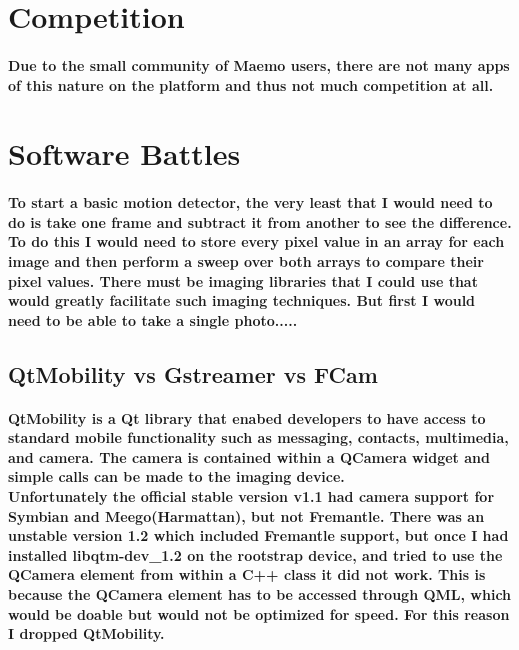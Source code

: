 \documentclass[11pt]{article} %
\begin{document}
\section{Competition}
\paragraph{Due to the small community of Maemo users, there are not many apps of this nature on the platform and thus not much competition at all.}

\section{Software Battles}
\paragraph{To start a basic motion detector, the very least that I would need to do is take one frame and subtract it from another to see the difference. To do this I would need to store every pixel value in an array for each image and then perform a sweep over both arrays to compare their pixel values. There must be imaging libraries that I could use that would greatly facilitate such imaging techniques. But first I would need to be able to take a single photo.....}

\subsection{QtMobility vs Gstreamer vs FCam}
\paragraph{QtMobility is a Qt library that enabed developers to have access to standard mobile functionality such as messaging, contacts, multimedia, and camera.  The camera is contained within a QCamera widget and simple calls can be made to the imaging device.
\\Unfortunately the official stable version v1.1 had camera support for Symbian and Meego(Harmattan), but not Fremantle. There was an unstable version 1.2 which included Fremantle support, but once I had installed libqtm-dev\_1.2 on the rootstrap device, and tried to use the QCamera element from within a C++ class it did not work. This is because the QCamera element has to be accessed through QML, which would be doable but would not be optimized for speed. For this reason I dropped QtMobility.
}
\end{document}
